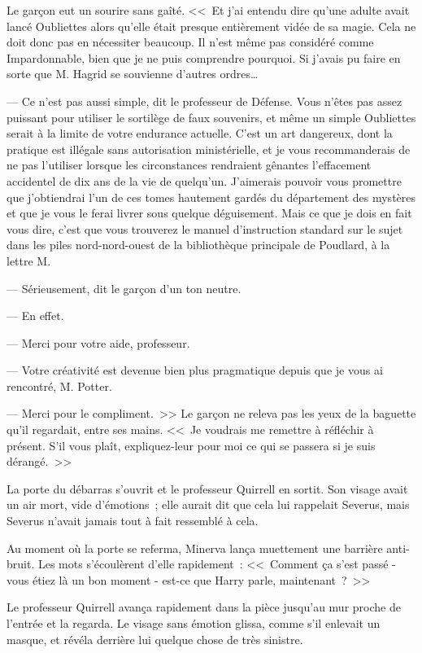 Le garçon eut un sourire sans gaîté. <<~Et j'ai entendu dire qu'une adulte avait lancé Oubliettes alors qu'elle était presque entièrement vidée de sa magie. Cela ne doit donc pas en nécessiter beaucoup. Il n'est même pas considéré comme Impardonnable, bien que je ne puis comprendre pourquoi. Si j'avais pu faire en sorte que M. Hagrid se souvienne d'autres ordres…

--- Ce n'est pas aussi simple, dit le professeur de Défense. Vous n'êtes pas assez puissant pour utiliser le sortilège de faux souvenirs, et même un simple Oubliettes serait à la limite de votre endurance actuelle. C'est un art dangereux, dont la pratique est illégale sans autorisation ministérielle, et je vous recommanderais de ne pas l'utiliser lorsque les circonstances rendraient gênantes l'effacement accidentel de dix ans de la vie de quelqu'un. J'aimerais pouvoir vous promettre que j'obtiendrai l'un de ces tomes hautement gardés du département des mystères et que je vous le ferai livrer sous quelque déguisement. Mais ce que je dois en fait vous dire, c'est que vous trouverez le manuel d'instruction standard sur le sujet dans les piles nord-nord-ouest de la bibliothèque principale de Poudlard, à la lettre M.

--- Sérieusement, dit le garçon d'un ton neutre.

--- En effet.

--- Merci pour votre aide, professeur.

--- Votre créativité est devenue bien plus pragmatique depuis que je vous ai rencontré, M. Potter.

--- Merci pour le compliment.~>> Le garçon ne releva pas les yeux de la baguette qu'il regardait, entre ses mains. <<~Je voudrais me remettre à réfléchir à présent. S'il vous plaît, expliquez-leur pour moi ce qui se passera si je suis dérangé.~>>

\later

La porte du débarras s'ouvrit et le professeur Quirrell en sortit. Son visage avait un air mort, vide d'émotions~; elle aurait dit que cela lui rappelait Severus, mais Severus n'avait jamais tout à fait ressemblé à cela.

Au moment où la porte se referma, Minerva lança muettement une barrière anti-bruit. Les mots s'écoulèrent d'elle rapidement~: <<~Comment ça s'est passé - vous étiez là un bon moment - est-ce que Harry parle, maintenant~?~>>

Le professeur Quirrell avança rapidement dans la pièce jusqu'au mur proche de l'entrée et la regarda. Le visage sans émotion glissa, comme s'il enlevait un masque, et révéla derrière lui quelque chose de très sinistre.

